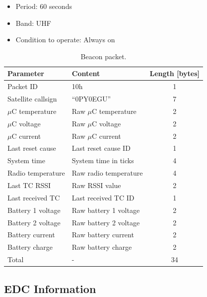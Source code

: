 \begin{itemize}
    \item Period: 60 seconds
    \item Band: UHF
    \item Condition to operate: Always on
\end{itemize}

\begin{table}[!ht]
    \centering
    \begin{tabular}{llc}
        \toprule[1.5pt]
        \textbf{Parameter} & \textbf{Content}       & \textbf{Length [bytes]} \\
        \midrule
        Packet ID          & 10h                    & 1 \\
        Satellite callsign & ``0PY0EGU''            & 7 \\
        $\mu$C temperature & Raw $\mu$C temperature & 2 \\
        $\mu$C voltage     & Raw $\mu$C voltage     & 2 \\
        $\mu$C current     & Raw $\mu$C current     & 2 \\
        Last reset cause   & Last reset cause ID    & 1 \\
        System time        & System time in ticks   & 4 \\
        Radio temperature  & Raw radio temperature  & 4 \\
        Last TC RSSI       & Raw RSSI value         & 2 \\
        Last received TC   & Last received TC ID    & 1 \\
        Battery 1 voltage  & Raw battery 1 voltage  & 2 \\
        Battery 2 voltage  & Raw battery 2 voltage  & 2 \\
        Battery current    & Raw battery current    & 2 \\
        Battery charge     & Raw battery charge     & 2 \\
        \midrule
        Total              & -                      & 34 \\
        \bottomrule[1.5pt]
    \end{tabular}
    \caption{Beacon packet.}
    \label{tab:telemetry-beacon}
\end{table}

\subsection{EDC Information}

